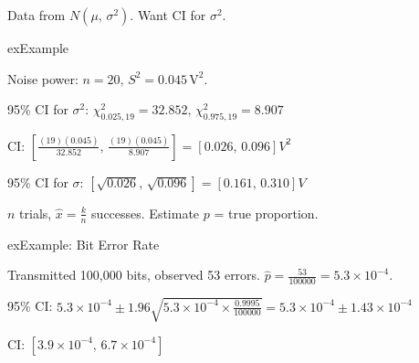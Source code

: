 
Data from $N(\mu,\, \sigma^{2})$. Want CI for $\sigma^{2}$.





\begin{PSbox}[unbreakable]{ex}{Example}

Noise power: $n = 20,\, S^{2} = 0.045\,\mathrm{V}^{2}$.

95\% CI for $\sigma^{2}$: $\chi^{2}_{0.025, 19} = 32.852,\, \chi^{2}_{0.975, 19} = 8.907$

CI: $\left[\frac{(19)(0.045)}{32.852},\, \frac{(19)(0.045)}{8.907}\right] = [0.026,\, 0.096] V^{2}$

95\% CI for $\sigma$: $\left[\sqrt{0.026},\, \sqrt{0.096}\right] = [0.161,\, 0.310] V$

\end{PSbox}



$n$ trials, $\hat{x} = \frac{k}{n}$ successes. Estimate $p$ = true proportion.



\begin{PSbox}[unbreakable]{ex}{Example: Bit Error Rate}

Transmitted 100,000 bits, observed 53 errors. $\hat{p} = \frac{53}{100000} = 5.3 \times 10^{-4}$.

95\% CI: $5.3 \times 10^{-4} \pm 1.96\sqrt{5.3 \times 10^{-4} \times \frac{0.9995}{100000}} = 5.3 \times 10^{-4} \pm 1.43 \times 10^{-4}$

CI: \textbf{$[3.9 \times 10^{-4},\, 6.7 \times 10^{-4}]$}

\end{PSbox}


